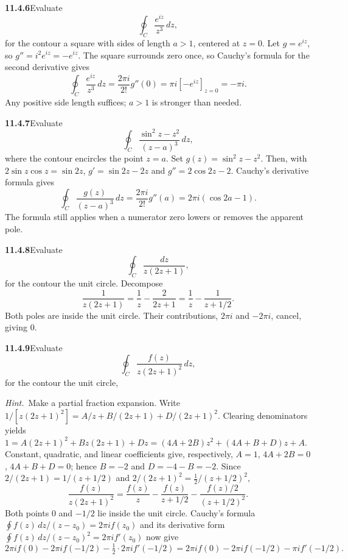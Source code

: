 \par\bigskip
\noindent\textbf{11.4.6}\quad Evaluate
\[
\oint_{C}\frac{e^{iz}}{z^{3}}\,dz,
\]
for the contour a square with sides of length $a>1$, centered at $z=0$.
\solution
Let $g=e^{iz}$, so $g''=i^2e^{iz}=-e^{iz}$. The square surrounds zero
once, so Cauchy's formula for the second derivative gives
\[
\oint_C\frac{e^{iz}}{z^3}\,dz
=\frac{2\pi i}{2!}g''(0)
=\pi i[-e^{iz}]_{z=0}=\boxed{-\pi i}.
\]
Any positive side length suffices; $a>1$ is stronger than needed.

\par\bigskip
\noindent\textbf{11.4.7}\quad Evaluate
\[
\oint_{C}\frac{\sin^{2}z-z^{2}}{(z-a)^{3}}\,dz,
\]
where the contour encircles the point $z=a$.
\solution
Set $g(z)=\sin^2z-z^2$. Then, with $2\sin z\cos z=\sin2z$,
$g'=\sin2z-2z$ and $g''=2\cos2z-2$.
Cauchy's derivative formula gives
\[
\oint_C\frac{g(z)}{(z-a)^3}\,dz
=\frac{2\pi i}{2!}g''(a)
=\boxed{2\pi i(\cos2a-1)}.
\]
The formula still applies when a numerator zero lowers or removes
the apparent pole.

\par\bigskip
\noindent\textbf{11.4.8}\quad Evaluate
\[
\oint_{C}\frac{dz}{z(2z+1)},
\]
for the contour the unit circle.
\solution
Decompose
\[
\frac1{z(2z+1)}=\frac1z-\frac2{2z+1}
=\frac1z-\frac1{z+1/2}.
\]
Both poles are inside the unit circle. Their contributions,
$2\pi i$ and $-2\pi i$, cancel, giving $\boxed0$.

\par\bigskip
\noindent\textbf{11.4.9}\quad Evaluate
\[
\oint_{C}\frac{f(z)}{z(2z+1)^{2}}\,dz,
\]
for the contour the unit circle, 

\emph{Hint.}~Make a partial fraction expansion.
\solution
{}
Write
$1/[z(2z+1)^2]=A/z+B/(2z+1)+D/(2z+1)^2$.
Clearing denominators yields
$1=A(2z+1)^2+Bz(2z+1)+Dz=(4A+2B)z^2+(4A+B+D)z+A$.
Constant, quadratic, and linear coefficients give, respectively,
$A=1$, $4A+2B=0$, $4A+B+D=0$; hence $B=-2$ and $D=-4-B=-2$.
Since $2/(2z+1)=1/(z+1/2)$ and $2/(2z+1)^2=\tfrac12/(z+1/2)^2$,
\[
\frac{f(z)}{z(2z+1)^2}
=\frac{f(z)}z-\frac{f(z)}{z+1/2}
-\frac{f(z)/2}{(z+1/2)^2}.
\]
Both points $0$ and $-1/2$ lie inside the unit circle. Cauchy's formula
$\oint f(z)\,dz/(z-z_0)=2\pi if(z_0)$ and its derivative form
$\oint f(z)\,dz/(z-z_0)^2=2\pi if'(z_0)$ now give
\[
2\pi if(0)-2\pi if(-1/2)-\tfrac12\cdot2\pi if'(-1/2)
=\boxed{2\pi i f(0)-2\pi i f(-1/2)-\pi i f'(-1/2)}.
\]

